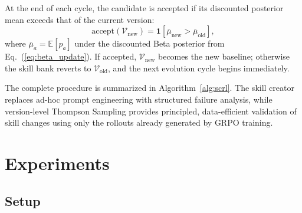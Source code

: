 \documentclass{article}
\theoremstyle{plain}
\theoremstyle{definition}
\theoremstyle{remark}
\begin{document}
At the end of each cycle, the candidate is accepted if its discounted posterior mean exceeds that of the current version:
\begin{equation}
    \text{accept}(\mathcal{V}_{\text{new}}) = \mathbf{1}\!\left[\bar{\mu}_{\text{new}} > \bar{\mu}_{\text{old}}\right],
    \label{eq:accept}
\end{equation}
where $\bar{\mu}_a = \mathbb{E}[p_a]$ under the discounted Beta posterior from Eq.~(\ref{eq:beta_update}). If accepted, $\mathcal{V}_{\text{new}}$ becomes the new baseline; otherwise the skill bank reverts to $\mathcal{V}_{\text{old}}$, and the next evolution cycle begins immediately.


The complete procedure is summarized in Algorithm~\ref{alg:scrl}. The skill creator replaces ad-hoc prompt engineering with structured failure analysis, while version-level Thompson Sampling provides principled, data-efficient validation of skill changes using only the rollouts already generated by GRPO training.


\section{Experiments}
\label{sec:experiments}


\subsection{Setup}
\end{document}
